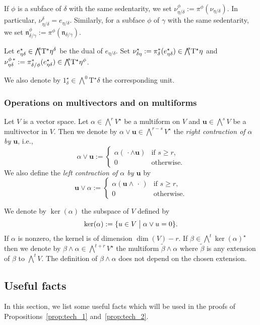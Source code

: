 \documentclass[11pt]{amsart}
\theoremstyle{definition}
\numberwithin{equation}{section}
\newcommand{\ie}{i.e.}
\renewcommand{\~}{\widetilde}
\newcommand{\ldot}{\,\cdot}
\newcommand{\ccdot}{\,\cdot\,}
\let\oldbigwedge\bigwedge
\renewcommand{\bigwedge}{{\textstyle\oldbigwedge\!}}
\renewcommand{\u}{\mathbf u} %
\newcommand{\TT}{\mathrm{T}} %
\newcommand{\dual}{\star} %
\newcommand{\nvect}{\mathfrak n} %
\newcommand{\st}{\bigm|} %
\begin{document}
{If $\phi$ is a subface of $\delta$ with the same sedentarity, we set $\nu^\phi_{\eta/\delta}:=\pi^\phi(\nu_{\eta/\delta})$. In particular, $\nu^\delta_{\eta/\delta}=e_{\eta/\delta}$. Similarly, for a subface $\phi$ of $\gamma$ with the same sedentarity, we set $\nvect^\phi_{\delta/\gamma}:=\pi^\phi(\nvect_{\delta/\gamma})$.

\smallskip
Let $e_{\eta\/\delta}^\dual\in\bigwedge^s\TT^\dual\eta^\delta$ be the dual of $e_{\eta/\delta}$. Set $\nu^\dual_{\delta\/\eta}:=\pi_\delta^*(e^\dual_{\eta\/\delta})\in\bigwedge^s\TT^\dual\eta$ and $\nu^{\phi\,*}_{\eta\/\delta}:=\pi_{\delta/\phi}^*(e^\dual_{\eta\/\delta})\in\bigwedge^s\TT^\dual\eta^\phi$.

\smallskip
We also denote by $1_\delta^\dual\in\bigwedge^0\TT^\dual\delta$ the corresponding unit.

\medskip


\subsubsection*{Operations on multivectors and on multiforms}
Let $V$ is a vector space. Let $\alpha\in\bigwedge^r V^\dual$ be a multiform on $V$ and $\u\in\bigwedge^s V$ be a multivector in $V$. Then we denote by $\alpha \vee \u \in \bigwedge^{r-s}V^\dual$ the \emph{right contraction of $\alpha$ by $\u$}, \ie,
\[ \alpha\vee\u := \begin{cases}
  \alpha(\ldot \wedge \u) & \text{if $s\geq r$}, \\
  0 & \text{otherwise}.
\end{cases} \]
We also define the \emph{left contraction of $\alpha$ by $\u$} by
\[ \u\vee\alpha := \begin{cases}
  \alpha(\u \wedge \ccdot) & \text{if $s\geq r$}, \\
  0 & \text{otherwise}.
\end{cases} \]

We denote by $\ker(\alpha)$ the subspace of $V$ defined by
\[ \ker(\alpha) := \{u \in V \st \alpha\vee u = 0 \}. \]
If $\alpha$ is nonzero, the kernel is of dimension $\dim(V)-r$. If $\beta \in \bigwedge^t \ker(\alpha)^\dual$ then we denote by $\beta\wedge\alpha \in \bigwedge^{t+r}V^\dual$ the multiform $\~\beta\wedge\alpha$ where $\~\beta$ is any extension of $\beta$ to $\bigwedge^t V$. The definition of $\beta\wedge\alpha$ does not depend on the chosen extension.



\subsection{Useful facts}
In this section, we list some useful facts which will be used in the proofs of Propositions~\ref{prop:tech_1} and~\ref{prop:tech_2}.

}
\end{document}
